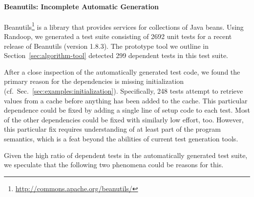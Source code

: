 \paragraph{Beanutils: Incomplete Automatic Generation}

Beanutils\footnote{\url{http://commons.apache.org/beanutils/}} 
is a library that provides services for collections of
Java beans. Using Randoop, we generated a test suite consisting of
2692 unit tests for a recent release of Beanutils (version 1.8.3).
The prototype tool we outline in
Section~\ref{sec:algorithm-tool} detected 299 dependent tests in this test
suite.

After a close inspection of the automatically generated test code, we found
the primary reason for the dependencies is missing initialization 
(cf.~Sec.~\ref{sec:examples:initialization}).
Specifically, 248 tests attempt to retrieve values from a cache before
anything has been added to the cache. This particular dependence could be
fixed by adding a single line of setup code to each test.
Most of the other dependencies could be fixed with similarly low effort, too.
However, this particular fix requires understanding of at least part
of the program semantics, which is a feat beyond the abilities of
current test generation tools.



Given the high ratio of dependent tests in the automatically generated
test suite, we speculate that the following two phenomena could be
reasons for this.

